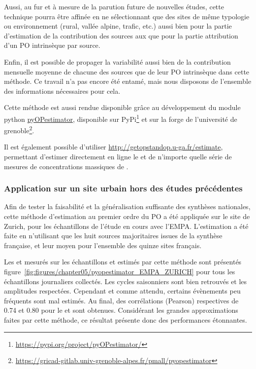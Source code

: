 Aussi, au fur et à mesure de la parution future de nouvelles études, cette technique pourra être 
affinée en ne sélectionnant que des sites de même typologie ou
environnement (rural, vallée alpine, trafic, etc.) aussi bien pour la partie d'estimation
de la contribution des sources aux \PMdix{} que pour la partie attribution d'un PO
intrinsèque par source.

Enfin, il est possible de propager la variabilité aussi bien de la contribution mensuelle
moyenne de chacune des sources que de leur PO intrinsèque dans cette méthode. Ce travail n'a
pas encore été entamé, mais nous disposons de l'ensemble des informations nécessaires pour
cela.

\begin{tcolorbox}[colback=red!5!white,colframe=Melon,title=Note]
    Cette méthode est aussi rendue disponible grâce au développement du module python
    \href{https://gricad-gitlab.univ-grenoble-alpes.fr/pmall/pyopestimator}{pyOPestimator},
    disponible sur PyPi\footnote{\url{https://pypi.org/project/pyOPestimator/}} et sur la
    forge de l'université de
    grenoble\footnote{\url{https://gricad-gitlab.univ-grenoble-alpes.fr/pmall/pyopestimator}}.

    Il est également possible d'utiliser \url{http://getopstandop.u-ga.fr/estimate},
    permettant d'estimer directement en ligne le \POAAv{} et \PODTTv{} de n'importe quelle
    série de mesures de concentrations massiques de \PMdix.
\end{tcolorbox}

\subsubsection{Application sur un site urbain hors des études précédentes}

Afin de tester la faisabilité et la généralisation suffisante des synthèses nationales,
cette méthode d'estimation au premier ordre du PO a été appliquée sur le site de Zurich,
pour les échantillons de l'étude en cours avec l'EMPA. 
L'estimation a été faite en n'utilisant que les huit sources majoritaires issues de la
synthèse française, et leur \OPm{} moyen pour l'ensemble des quinze sites français.

Les \POAAv{} et \PODTTv{} mesurés sur les échantillons et estimés par cette méthode sont
présentés figure~\ref{fig:figures/chapter05/pyopestimator_EMPA_ZURICH} pour tous les
échantillons journaliers collectés.  Les cycles saisonniers sont bien retrouvés et les
amplitudes respectées. Cependant et comme attendu, certains évènements peu fréquents sont
mal estimés. Au final, des corrélations (Pearson) respectives de 0.74 et 0.80 pour le
\POAAv{} et \PODTTv{} sont obtenues.  Considérant les grandes approximations faites par cette
méthode, ce résultat présente donc des performances étonnantes.

